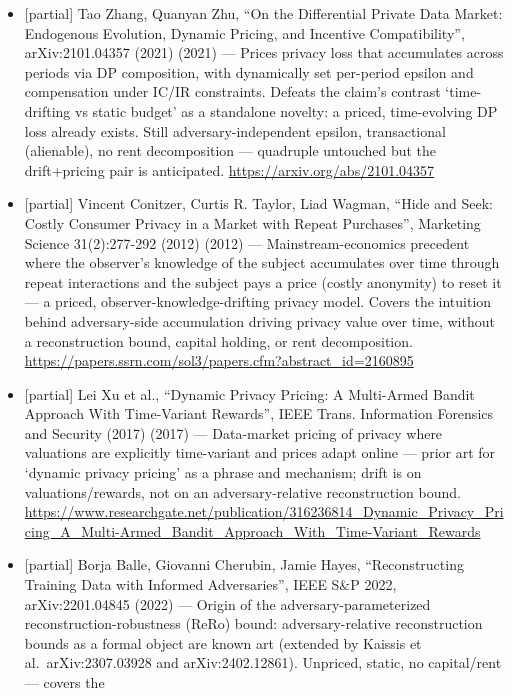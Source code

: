 \documentclass[
  11pt,
]{article}
\providecommand{\tightlist}{%
  \setlength{\itemsep}{0pt}\setlength{\parskip}{0pt}}
\begin{document}
\begin{itemize}
\tightlist
\item
  {[}partial{]} Tao Zhang, Quanyan Zhu, ``On the Differential Private
  Data Market: Endogenous Evolution, Dynamic Pricing, and Incentive
  Compatibility'', arXiv:2101.04357 (2021) (2021) --- Prices privacy
  loss that accumulates across periods via DP composition, with
  dynamically set per-period epsilon and compensation under IC/IR
  constraints. Defeats the claim's contrast `time-drifting vs static
  budget' as a standalone novelty: a priced, time-evolving DP loss
  already exists. Still adversary-independent epsilon, transactional
  (alienable), no rent decomposition --- quadruple untouched but the
  drift+pricing pair is anticipated.
  \url{https://arxiv.org/abs/2101.04357}
\item
  {[}partial{]} Vincent Conitzer, Curtis R. Taylor, Liad Wagman, ``Hide
  and Seek: Costly Consumer Privacy in a Market with Repeat Purchases'',
  Marketing Science 31(2):277-292 (2012) (2012) --- Mainstream-economics
  precedent where the observer's knowledge of the subject accumulates
  over time through repeat interactions and the subject pays a price
  (costly anonymity) to reset it --- a priced,
  observer-knowledge-drifting privacy model. Covers the intuition behind
  adversary-side accumulation driving privacy value over time, without a
  reconstruction bound, capital holding, or rent decomposition.
  \url{https://papers.ssrn.com/sol3/papers.cfm?abstract_id=2160895}
\item
  {[}partial{]} Lei Xu et al., ``Dynamic Privacy Pricing: A Multi-Armed
  Bandit Approach With Time-Variant Rewards'', IEEE Trans. Information
  Forensics and Security (2017) (2017) --- Data-market pricing of
  privacy where valuations are explicitly time-variant and prices adapt
  online --- prior art for `dynamic privacy pricing' as a phrase and
  mechanism; drift is on valuations/rewards, not on an
  adversary-relative reconstruction bound.
  \url{https://www.researchgate.net/publication/316236814_Dynamic_Privacy_Pricing_A_Multi-Armed_Bandit_Approach_With_Time-Variant_Rewards}
\item
  {[}partial{]} Borja Balle, Giovanni Cherubin, Jamie Hayes,
  ``Reconstructing Training Data with Informed Adversaries'', IEEE S\&P
  2022, arXiv:2201.04845 (2022) --- Origin of the
  adversary-parameterized reconstruction-robustness (ReRo) bound:
  adversary-relative reconstruction bounds as a formal object are known
  art (extended by Kaissis et al.~arXiv:2307.03928 and
  arXiv:2402.12861). Unpriced, static, no capital/rent --- covers the

\end{itemize}
\end{document}
